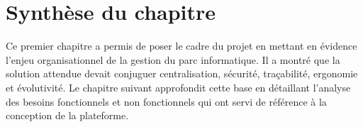 \section{Synthèse du chapitre}
Ce premier chapitre a permis de poser le cadre du projet en mettant en évidence l'enjeu organisationnel de la gestion du parc informatique. Il a montré que la solution attendue devait conjuguer centralisation, sécurité, traçabilité, ergonomie et évolutivité. Le chapitre suivant approfondit cette base en détaillant l'analyse des besoins fonctionnels et non fonctionnels qui ont servi de référence à la conception de la plateforme.









